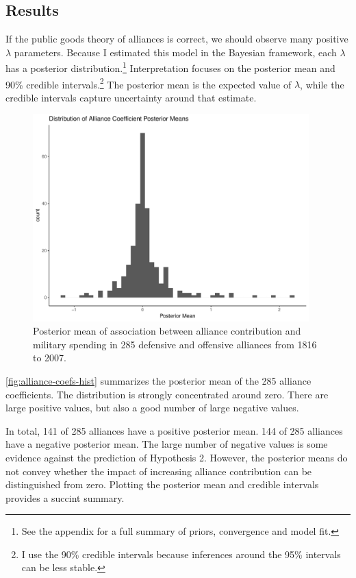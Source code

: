 \documentclass[12pt]{article}
\begin{document}
\subsection{Results} 


If the public goods theory of alliances is correct, we should observe many positive $\lambda$ parameters. 
Because I estimated this model in the Bayesian framework, each $\lambda$ has a posterior distribution.\footnote{See the appendix for a full summary of priors, convergence and model fit.} 
Interpretation focuses on the posterior mean and 90\% credible intervals.\footnote{I use the 90\% credible intervals because inferences around the 95\% intervals can be less stable.}
The posterior mean is the expected value of $\lambda$, while the credible intervals capture uncertainty around that estimate.  


\begin{figure}[htbp]
	\centering
		\includegraphics[width=0.95\textwidth]{alliance-coefs-hist.pdf}
	\caption{Posterior mean of association between alliance contribution and military spending in 285 defensive and offensive alliances from 1816 to 2007.}
	\label{fig:alliance-coefs-hist}
\end{figure}


\autoref{fig:alliance-coefs-hist} summarizes the posterior mean of the 285 alliance coefficients. 
The distribution is strongly concentrated around zero. 
There are large positive values, but also a good number of large negative values.


In total, 141 of 285 alliances have a positive posterior mean. 
144 of 285 alliances have a negative posterior mean. 
The large number of negative values is some evidence against the prediction of Hypothesis 2. 
However, the posterior means do not convey whether the impact of increasing alliance contribution can be distinguished from zero. 
Plotting the posterior mean and credible intervals provides a succint summary. 
\end{document}

